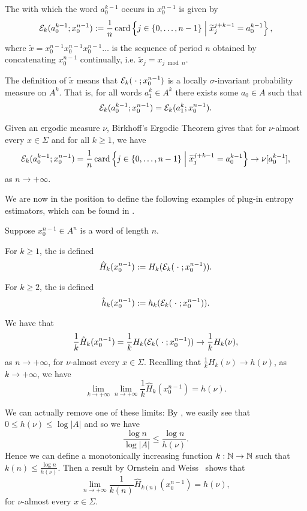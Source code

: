 \begin{definition}
	The  with which the word $a_0^{k - 1}$ occurs in $x_0^{n - 1}$ is given by
	\[
		\mathcal{E}_k(a_0^{k - 1}; x_0^{n - 1}) := \frac{1}{n}\operatorname{card}\left\{j \in \{0, \dots, n - 1\} \mathrel{}\middle|\mathrel{} \widetilde{x}_j^{j + k - 1} = a_0^{k - 1} \right\},
	\]
	where $\tilde{x} = x_0^{n - 1} x_0^{n - 1} x_0^{n - 1} \dots$ is the sequence of period $n$ obtained by concatenating $x_0^{n - 1}$ continually, i.e. $\tilde{x}_j = x_{j \bmod n}$.
\end{definition}

The definition of $\tilde{x}$ means that $\mathcal{E}_k(\mathrel{}\cdot\mathrel{}; x_0^{n - 1})$ is a locally $\sigma$-invariant probability measure on $A^k$. That is, for all words $a_1^k \in A^k$ there exists some $a_0 \in A$ such that
\[
	\mathcal{E}_k(a_0^{k - 1}; x_0^{n - 1}) = \mathcal{E}_k(a_1^k; x_0^{n - 1}).
\]

Given an ergodic measure $\nu$, Birkhoff's Ergodic Theorem gives that for $\nu$-almost every $x \in \Sigma$ and for all $k \geq 1$, we have
\[
	\mathcal{E}_k(a_0^{k - 1}; x_0^{n - 1}) = \frac{1}{n}\operatorname{card}\left\{j \in \{0, \dots, n - 1\} \mathrel{}\middle|\mathrel{} \widetilde{x}_j^{j + k - 1} = a_0^{k - 1} \right\} \to \nu[a_0^{k - 1}],
\]
as $n \to +\infty$.

We are now in the position to define the following examples of plug-in entropy estimators, which can be found in \cite[Definition 2.1]{chazottes-gabrielle:large-deviations}.

\begin{definition}
	Suppose $x_0^{n - 1} \in A^n$ is a word of length $n$.
	
	For $k \geq 1$, the  is defined
	\[
		\hat{H}_k(x_0^{n - 1}) := H_k(\mathcal{E}_k(\mathrel{}\cdot\mathrel{}; x_0^{n - 1})).
	\]
	
	For $k \geq 2$, the  is defined
	\[
		\hat{h}_k(x_0^{n - 1}) := h_k(\mathcal{E}_k(\mathrel{}\cdot\mathrel{}; x_0^{n - 1})).
	\]
\end{definition}

We have that
\[
	\frac{1}{k} \hat{H}_k(x_0^{n - 1}) = \frac{1}{k} H_k(\mathcal{E}_k(\mathrel{}\cdot\mathrel{}; x_0^{n - 1})) \to \frac{1}{k} H_k(\nu),
\]
as $n \to +\infty$, for $\nu$-almost every $x \in \Sigma$. Recalling that $\frac{1}{k} H_k(\nu) \to h(\nu)$, as $k \to +\infty$, we have
\[
	\lim_{k \to +\infty} \lim_{n \to +\infty}{\frac{1}{k} \hat{H}_k(x_0^{n - 1})} = h(\nu).
\]

We can actually remove one of these limits: By , we easily see that $0 \leq h(\nu) \leq \log{|A|}$ and so we have
\[
	\frac{\log{n}}{\log{|A|}} \leq \frac{\log{n}}{h(\nu)}.
\]
Hence we can define a monotonically increasing function $k : \mathbb{N} \to \mathbb{N}$ such that $k(n) \leq \frac{\log{n}}{h(\nu)}$. Then a result by Ornstein and Weiss~\cite{shields:ergodic} shows that
\[
	\lim_{n \to +\infty}{\frac{1}{k(n)}\hat{H}_{k(n)}(x_0^{n -1})} = h(\nu),
\]
for $\nu$-almost every $x \in \Sigma$.

